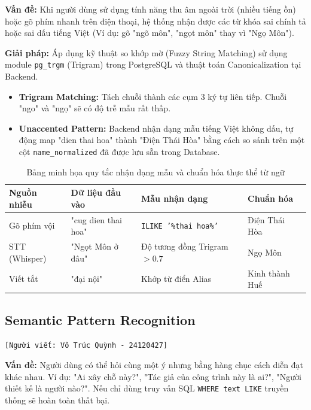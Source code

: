 \textbf{Vấn đề:} Khi người dùng sử dụng tính năng thu âm ngoài trời (nhiều tiếng ồn) hoặc gõ phím nhanh trên điện thoại, hệ thống nhận được các từ khóa sai chính tả hoặc sai dấu tiếng Việt (Ví dụ: gõ "ngõ môn", "ngọt môn" thay vì "Ngọ Môn").

\textbf{Giải pháp:} Áp dụng kỹ thuật so khớp mờ (Fuzzy String Matching) sử dụng module \texttt{pg\_trgm} (Trigram) trong PostgreSQL và thuật toán Canonicalization tại Backend.
\begin{itemize}
    \item \textbf{Trigram Matching:} Tách chuỗi thành các cụm 3 ký tự liên tiếp. Chuỗi "ngo" và "ngọ" sẽ có độ trễ mẫu rất thấp.
    \item \textbf{Unaccented Pattern:} Backend nhận dạng mẫu tiếng Việt không dấu, tự động map "dien thai hoa" thành "Điện Thái Hòa" bằng cách so sánh trên một cột \texttt{name\_normalized} đã được lưu sẵn trong Database.
\end{itemize}

\begin{table}[H]
    \centering
    \renewcommand{\arraystretch}{1.3}
    \begin{tabular}{|p{3cm}|p{5cm}|p{3.5cm}|p{3cm}|}
        \hline
        \textbf{Nguồn nhiễu} & \textbf{Dữ liệu đầu vào} & \textbf{Mẫu nhận dạng} & \textbf{Chuẩn hóa} \\ \hline
        Gõ phím vội & "cug dien thai hoa" & \texttt{ILIKE '\%thai hoa\%'} & Điện Thái Hòa \\ \hline
        STT (Whisper) & "Ngọt Môn ở đâu" & Độ tương đồng Trigram $> 0.7$ & Ngọ Môn \\ \hline
        Viết tắt & "đại nội" & Khớp từ điển Alias & Kinh thành Huế \\ \hline
    \end{tabular}
    \caption{Bảng minh họa quy tắc nhận dạng mẫu và chuẩn hóa thực thể từ ngữ}
\end{table}

\subsection{Semantic Pattern Recognition}
\texttt{[Người viết: Võ Trúc Quỳnh - 24120427]}

\textbf{Vấn đề:} Người dùng có thể hỏi cùng một ý nhưng bằng hàng chục cách diễn đạt khác nhau. Ví dụ: "Ai xây chỗ này?", "Tác giả của công trình này là ai?", "Người thiết kế là người nào?". Nếu chỉ dùng truy vấn SQL \texttt{WHERE text LIKE} truyền thống sẽ hoàn toàn thất bại.

